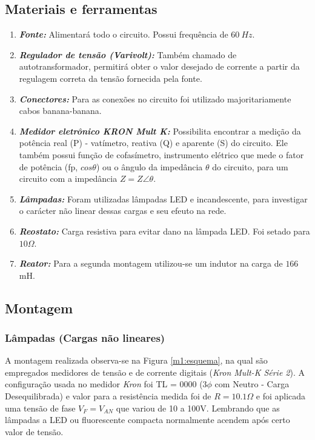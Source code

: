\documentclass[a4paper,12pt,oneside,openany,table,xcdraw]{article}
\begin{document}
\subsection{Materiais e ferramentas} %
\begin{enumerate}[1 -]
\item \emph{\textbf{Fonte:}}
Alimentará todo o circuito. Possui frequência de $60\ Hz$.

\item \emph{\textbf{Regulador de tensão (Varivolt):}}
Também chamado de autotransformador, permitirá obter o valor desejado de corrente a partir da regulagem correta da tensão fornecida pela fonte.

\item \emph{\textbf{Conectores:}}
Para as conexões no circuito foi utilizado majoritariamente cabos banana-banana.

\item \emph{\textbf{Medidor eletrônico KRON Mult K:}}
Possibilita encontrar a medição da potência real (P) - vatímetro, reativa (Q) e aparente (S) do circuito. Ele também possui função de cofasímetro, instrumento elétrico que mede o fator de potência (fp, $cos\theta$) ou o ângulo da impedância $\theta$ do circuito, para um circuito com a impedância $Z = Z\angle \theta$.

\item \emph{\textbf{Lâmpadas:}}
Foram utilizadas lâmpadas LED e incandescente, para investigar o carácter não linear dessas cargas e seu efeuto na rede.

\item \emph{\textbf{Reostato:}}
Carga resistiva para evitar dano na lâmpada LED. Foi setado para $10 \Omega$.

\item \emph{\textbf{Reator:}}
Para a segunda montagem utilizou-se um indutor na carga de $166$ mH.

\end{enumerate}


\subsection{Montagem} %

\subsubsection{Lâmpadas (Cargas não lineares)}
A montagem realizada observa-se na Figura \ref{m1:esquema}, na qual são empregados medidores de tensão e de corrente digitais (\emph{Kron Mult-K Série 2}). A configuração usada no medidor \emph{Kron} foi TL = 0000 ($3\phi$ com Neutro - Carga Desequilibrada) e valor para a resistência medida foi de $R=10.1\Omega$ e foi aplicada uma tensão de fase $V_F=V_{AN}$ que variou de 10 a 100V. Lembrando que as lâmpadas a LED ou fluorescente compacta normalmente acendem após certo valor de tensão.
\end{document}
